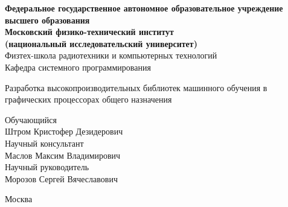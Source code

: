 \begin{titlepage}
	\begin{center}
	{\bf Федеральное государственное автономное образовательное учреждение \\
	высшего образования \\
	Московский физико-технический институт                                      \\
	(национальный исследовательский университет) \\ }
	Физтех-школа радиотехники и компьютерных технологий \\
	Кафедра системного программирования \\
	\vspace{1em}
	\end{center}

	\begin{center}
	\vspace{1cm}

	\vspace{\fill}

	\begin{LARGE}
	Разработка высокопроизводительных библиотек машинного обучения в графических процессорах общего назначения \\
	\end{LARGE}
	\vspace{1em}
	\vspace{1.5cm}
	\vspace{\fill}
	\end{center}


	\begin{flushright}
	Обучающийся\\
	Штром Кристофер Дезидерович\\

	\vspace{2em}
	Научный консультант \\
	Маслов Максим Владимирович\\

	\vspace{2em}
	Научный руководитель \\
	Морозов Сергей Вячеславович\\

	\end{flushright}

	\vspace{7em}

	\begin{center}
	Москва
	\the\year{}
	\end{center}
\end{titlepage}
